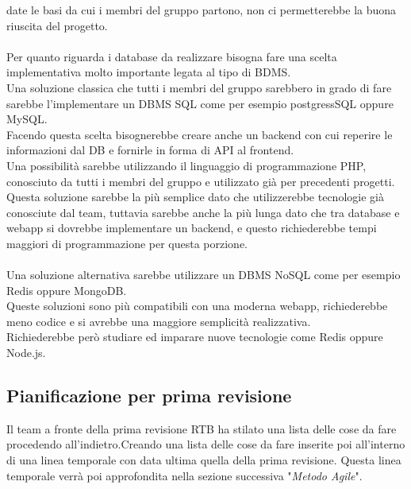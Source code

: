 date le basi da cui i membri del gruppo partono, non ci permetterebbe la buona riuscita del progetto.\\\\
Per quanto riguarda i database da realizzare bisogna fare una scelta implementativa molto importante legata al tipo di BDMS.\\
Una soluzione classica che tutti i membri del gruppo sarebbero in grado di fare sarebbe l'implementare un DBMS SQL come per esempio postgressSQL oppure MySQL.\\
Facendo questa scelta bisognerebbe creare anche un backend con cui reperire le informazioni dal DB e fornirle in forma di API al frontend.\\
Una possibilità sarebbe utilizzando il linguaggio di programmazione PHP, conosciuto da tutti i membri del gruppo e utilizzato già per 
precedenti progetti.\\
Questa soluzione sarebbe la più semplice dato che utilizzerebbe tecnologie già conosciute dal team, tuttavia sarebbe anche la più lunga dato che tra database e webapp
si dovrebbe implementare un backend, e questo richiederebbe tempi maggiori di programmazione per questa porzione.\\
\\
Una soluzione alternativa sarebbe utilizzare un DBMS NoSQL come per esempio Redis oppure MongoDB.\\
Queste soluzioni sono più compatibili con una moderna webapp, richiederebbe meno codice e si avrebbe una maggiore semplicità realizzativa.\\
Richiederebbe però studiare ed imparare nuove tecnologie come Redis oppure Node.js.\\

\subsection{Pianificazione per prima revisione}
Il team a fronte della prima revisione RTB ha stilato una lista delle cose da fare procedendo all'indietro.Creando una lista delle cose da fare inserite poi all'interno di una linea temporale con data ultima quella della prima revisione.
Questa linea temporale verrà poi approfondita nella sezione successiva "\textit{Metodo Agile}".


